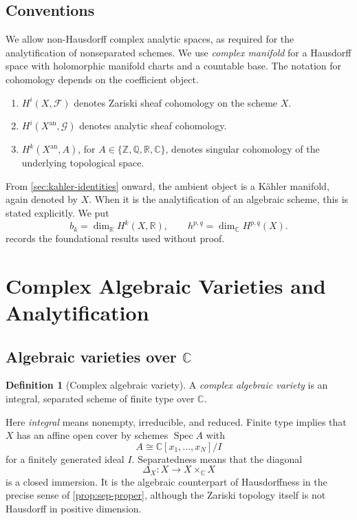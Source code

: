 \documentclass[11pt,reqno]{amsart}
\theoremstyle{definition}
\newtheorem{definition}[theorem]{Definition}
\theoremstyle{remark}
\newcommand{\C}{\mathbb{C}}
\newcommand{\R}{\mathbb{R}}
\newcommand{\Z}{\mathbb{Z}}
\newcommand{\Q}{\mathbb{Q}}
\newcommand{\Xan}{X^{\mathrm{an}}}
\DeclareMathOperator{\Spec}{Spec}
\begin{document}
\subsection{Conventions}
\label{subsec:conventions}

We allow non-Hausdorff complex analytic spaces, as required for the
analytification of nonseparated schemes. We use \emph{complex manifold}
for a Hausdorff space with holomorphic manifold charts and a countable base.
The notation for cohomology depends on the coefficient object.
\begin{enumerate}
  \item $H^i(X,\mathcal F)$ denotes Zariski sheaf cohomology on the scheme $X$.
  \item $H^i(\Xan,\mathcal G)$ denotes analytic sheaf cohomology.
  \item $H^k(\Xan,A)$, for $A\in\{\Z,\Q,\R,\C\}$, denotes singular
  cohomology of the underlying topological space.
\end{enumerate}
From \cref{sec:kahler-identities} onward, the ambient object is a K\"ahler
manifold, again denoted by $X$. When it is the analytification of an algebraic
scheme, this is stated explicitly. We put
\[
b_k=\dim_{\R}H^k(X,\R),
\qquad
h^{p,q}=\dim_{\C}H^{p,q}(X).
\]
 records the foundational results used without proof.

\section{Complex Algebraic Varieties and Analytification}
\label{sec:analytification}

\subsection{Algebraic varieties over \texorpdfstring{$\C$}{C}}

\begin{definition}[Complex algebraic variety]
\label{def:variety}
A \emph{complex algebraic variety} is an integral, separated scheme of finite
type over $\C$.
\end{definition}

Here \emph{integral} means nonempty, irreducible, and reduced. Finite type
implies that $X$ has an affine open cover by schemes $\Spec A$ with
\[
A\cong\C[x_1,\dots,x_N]/I
\]
for a finitely generated ideal $I$. Separatedness means that the diagonal
\[
\Delta_X:X\longrightarrow X\times_{\C}X
\]
is a closed immersion. It is the algebraic counterpart of Hausdorffness in the
precise sense of \cref{prop:sep-proper}, although the Zariski topology itself is
not Hausdorff in positive dimension.
\end{document}
